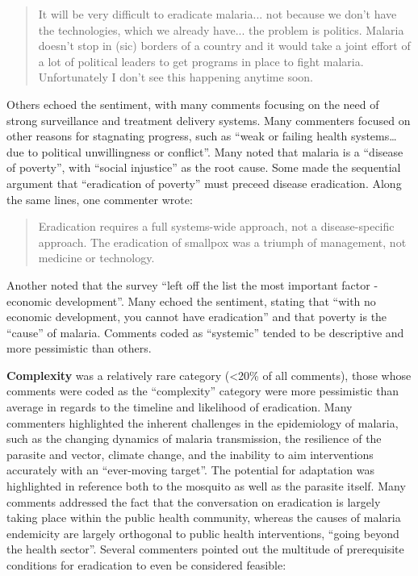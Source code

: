 \documentclass[]{article}
\begin{document}
\begin{quote}
It will be very difficult to eradicate malaria... not because we don't have the technologies, which we already have... the problem is politics. Malaria doesn't stop in (sic) borders of a country and it would take a joint effort of a lot of political leaders to get programs in place to fight malaria. Unfortunately I don't see this happening anytime soon.
\end{quote}

Others echoed the sentiment, with many comments focusing on the need of
strong surveillance and treatment delivery systems. Many commenters
focused on other reasons for stagnating progress, such as ``weak or
failing health systems\ldots{}due to political unwillingness or
conflict''. Many noted that malaria is a ``disease of poverty'', with
``social injustice'' as the root cause. Some made the sequential
argument that ``eradication of poverty'' must preceed disease
eradication. Along the same lines, one commenter wrote:

\begin{quote}
Eradication requires a full systems-wide approach, not a disease-specific approach. The eradication of smallpox was a triumph of management, not medicine or technology.
\end{quote}

Another noted that the survey ``left off the list the most important
factor - economic development''. Many echoed the sentiment, stating that
``with no economic development, you cannot have eradication'' and that
poverty is the ``cause'' of malaria. Comments coded as ``systemic''
tended to be descriptive and more pessimistic than others.

\textbf{Complexity} was a relatively rare category (\textless{}20\% of
all comments), those whose comments were coded as the ``complexity''
category were more pessimistic than average in regards to the timeline
and likelihood of eradication. Many commenters highlighted the inherent
challenges in the epidemiology of malaria, such as the changing dynamics
of malaria transmission, the resilience of the parasite and vector,
climate change, and the inability to aim interventions accurately with
an ``ever-moving target''. The potential for adaptation was highlighted
in reference both to the mosquito as well as the parasite itself. Many
comments addressed the fact that the conversation on eradication is
largely taking place within the public health community, whereas the
causes of malaria endemicity are largely orthogonal to public health
interventions, ``going beyond the health sector''. Several commenters
pointed out the multitude of prerequisite conditions for eradication to
even be considered feasible:
\end{document}
